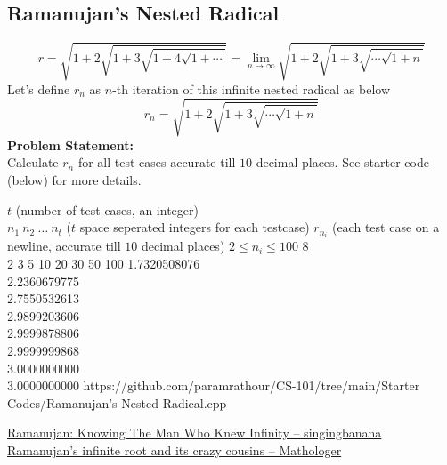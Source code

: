 \documentclass[../../Problems]{subfiles}
\begin{document}
\subsection{Ramanujan's Nested Radical}{\label{pp:ramanujanradical}}
\begin{equation}
{ r={\sqrt{1+2{\sqrt{1+3{\sqrt{1+4{\sqrt{1+\cdots }} }}}}}} = \lim_{n\rightarrow\infty} {\sqrt {1+2{\sqrt {1+3{\sqrt {\cdots \sqrt{1+ n}}}}}}}}
\end{equation}
Let's define $r_n$ as $n$-th iteration of this infinite nested radical as below
\begin{equation*}
{ r_n={\sqrt {1+2{\sqrt {1+3{\sqrt {\cdots \sqrt{1+ n}}}}}}}}
\end{equation*}
\textbf{Problem Statement:}\\
Calculate $r_n$ for all test cases accurate till $10$ decimal places. See starter code (below) for more details.
\begin{testcases}
	{$t$ \hfill(number of test cases, an integer)\\$n_1\ n_2\ \ldots\ n_t$ \hfill($t$ space seperated integers for each testcase)}
	{$r_{n_i}$ \hfill(each test case on a newline, accurate till $10$ decimal places)}
	{$2 \leq n_i \leq 100$}
	{8\\2 3 5 10 20 30 50 100}
	{1.7320508076\\2.2360679775\\2.7550532613\\2.9899203606\\2.9999878806\\2.9999999868\\3.0000000000\\3.0000000000}
	{https://github.com/paramrathour/CS-101/tree/main/Starter Codes/Ramanujan's Nested Radical.cpp}
\end{testcases}
\begin{funvideo}
\href{https://youtu.be/HMGZVKwYNfk}{Ramanujan: Knowing The Man Who Knew Infinity -- singingbanana}\\
\href{https://youtu.be/leFep9yt3JY}{Ramanujan's infinite root and its crazy cousins -- Mathologer}
\end{funvideo}
\end{document}
